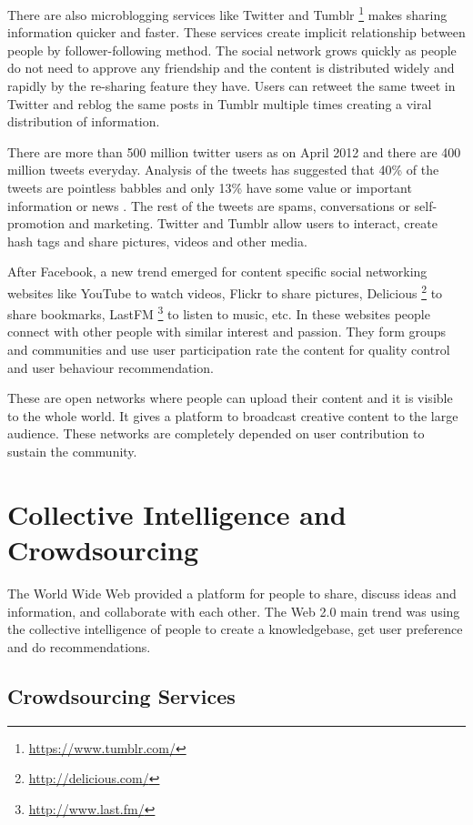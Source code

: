 There are also microblogging services like Twitter and Tumblr \footnote{\url{https://www.tumblr.com/}}  makes sharing information quicker and faster. These services create implicit relationship between people by follower-following method. The social network grows quickly as people do not need to approve any friendship and the content is distributed widely and rapidly by the re-sharing feature they have. Users can retweet the same tweet in Twitter and reblog the same posts in Tumblr multiple times creating a viral distribution of information.

There are more than 500 million twitter users as on April 2012 and there are 400 million tweets everyday. Analysis of the tweets has suggested that 40\% of the tweets are pointless babbles and only 13\% have some value or important information or news \cite{Whitelaw2011}. The rest of the tweets are spams, conversations or self-promotion and marketing. Twitter and Tumblr allow users to interact, create hash tags and share pictures, videos and other media.


After Facebook, a new trend emerged for content specific social networking websites like YouTube to watch videos, Flickr to share pictures, Delicious \footnote{\url{http://delicious.com/}}  to share bookmarks, LastFM \footnote{\url{http://www.last.fm/}} to listen to music, etc. In these websites people connect with other people with similar interest and passion. They form groups and communities and use user participation rate the content for quality control and user behaviour recommendation.

These are open networks where people can upload their content and it is visible to the whole world. It gives a platform to broadcast creative content to the large audience. These networks are completely depended on user contribution to sustain the community.


\section{Collective Intelligence and Crowdsourcing}

The World Wide Web provided a platform for people to share, discuss ideas and information, and collaborate with each other. The Web 2.0 main trend was using the collective intelligence of people to create a knowledgebase, get user preference and do recommendations.

\subsection{Crowdsourcing Services}

